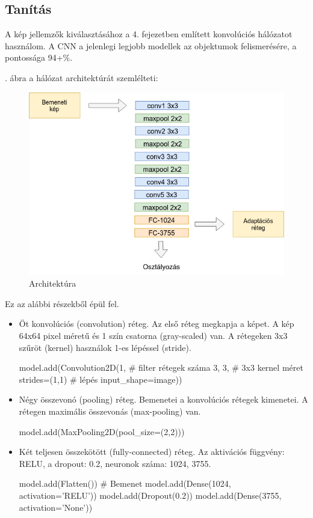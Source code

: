 \subsection{Tanítás}

A kép jellemzők kiválasztásához a 4. fejezetben említett konvolúciós hálózatot használom. A CNN a jelenlegi legjobb modellek az objektumok felismerésére, a pontossága 94+\%.

. ábra a hálózat architektúrát szemlélteti:

\begin{figure}[h]
	\centering
	\includegraphics[scale=0.45]{images/architecture}
	\caption{Architektúra}
	\label{fig:arch}
\end{figure}

Ez az alábbi részekből épül fel.
\begin{itemize}
\item Öt konvolúciós (convolution) réteg. Az első réteg megkapja a képet. A kép 64x64 pixel méretű és 1 szín csatorna (gray-scaled) van. A rétegeken 3x3 szűröt (kernel) használok 1-es lépéssel (stride).
\begin{python}
model.add(Convolution2D(1,	# filter rétegek száma    
                        3, 3,	# 3x3 kernel méret 
                        strides=(1,1) # lépés
                        input_shape=image))
\end{python}
\item Négy összevonó (pooling) réteg. Bemenetei a konvolúciós rétegek kimenetei. A rétegen maximális összevonás (max-pooling) van.
\begin{python}
model.add(MaxPooling2D(pool_size=(2,2)))
\end{python}
\item Két teljesen összekötött (fully-connected) réteg. Az aktivációs függvény: RELU, a dropout: 0.2, neuronok száma: 1024, 3755.
\begin{python}
model.add(Flatten()) # Bemenet
model.add(Dense(1024, activation='RELU'))
model.add(Dropout(0.2))
model.add(Dense(3755, activation='None'))
\end{python}
\end{itemize}

